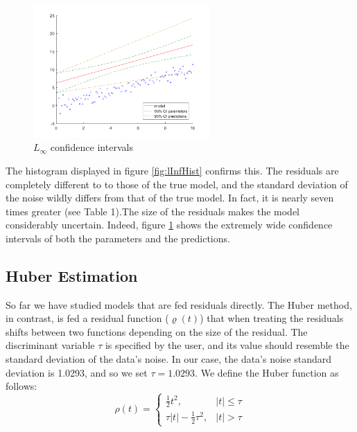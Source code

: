 \begin{figure}[htb]
\centering
\includegraphics[width=0.6\textwidth]{../img/LInf_CI}
\caption{$L_\infty$ confidence intervals}
\label{fig:lInfCI}
\end{figure}

The histogram displayed in figure \ref{fig:lInfHist} confirms this. The residuals are completely different to to those of the true model, and the standard deviation of the noise wildly differs from that of the true model. In fact, it is nearly seven times greater (see Table 1).The size of the residuals makes the model considerably uncertain. Indeed, figure \ref{fig:lInfCI} shows the extremely wide confidence intervals of both the parameters and the predictions.

\newpage
\subsection{Huber Estimation}

So far we have studied models that are fed residuals directly. The Huber method, in contrast, is fed a residual function ($\varrho(t)$) that when treating the residuals shifts between two functions depending on the size of the residual. The discriminant variable $\tau$ is specified by the user, and its value should resemble the standard deviation of the data's noise. In our case, the data's noise standard deviation is 1.0293, and so we set $\tau = 1.0293$. We define the Huber function as follows:
\begin{equation}
\rho (t) = \begin{cases} \frac{1}{2} t^2, &  \vert t \vert \leq \tau \\ 
\tau \vert t \vert -\frac{1}{2} \tau^2, & \vert t \vert > \tau \end{cases}
\label{eq:Huber}
\end{equation}

